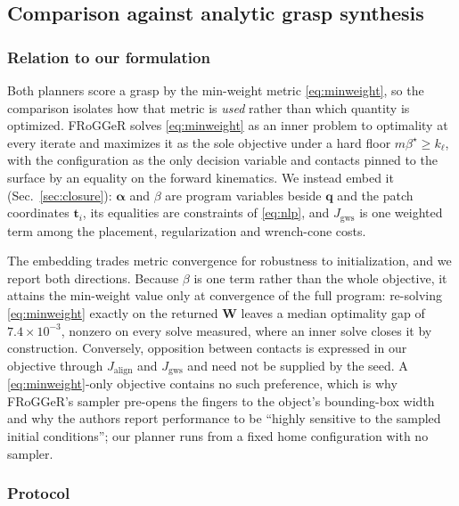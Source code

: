 \subsection{Comparison against analytic grasp synthesis}
\label{sec:frogger}

\subsubsection{Relation to our formulation}
\label{sec:frogger-relation}

Both planners score a grasp by the min-weight metric \eqref{eq:minweight}, so the
comparison isolates how that metric is \emph{used} rather than which quantity is
optimized. FRoGGeR solves \eqref{eq:minweight} as an inner problem to optimality at
every iterate and maximizes it as the sole objective under a hard floor
$m\beta^\star \ge k_\ell$, with the configuration as the only decision variable and
contacts pinned to the surface by an equality on the forward kinematics. We instead
embed it (Sec.~\ref{sec:closure}): $\bm{\alpha}$ and $\beta$ are program variables
beside $\bm{q}$ and the patch coordinates $\bm{t}_i$, its equalities are constraints
of \eqref{eq:nlp}, and $J_{\mathrm{gws}}$ is one weighted term among the placement,
regularization and wrench-cone costs.

The embedding trades metric convergence for robustness to initialization, and we
report both directions. Because $\beta$ is one term rather than the whole objective,
it attains the min-weight value only at convergence of the full program: re-solving
\eqref{eq:minweight} exactly on the returned $\bm{W}$ leaves a median optimality gap
of $7.4\times10^{-3}$, nonzero on every solve measured, where an inner solve closes it
by construction. Conversely, opposition between contacts is expressed in our objective
through $J_{\mathrm{align}}$ and $J_{\mathrm{gws}}$ and need not be supplied by the
seed. A \eqref{eq:minweight}-only objective contains no such preference, which is why
FRoGGeR's sampler pre-opens the fingers to the object's bounding-box width and why the
authors report performance to be ``highly sensitive to the sampled initial
conditions''; our planner runs from a fixed home configuration with no sampler.

\subsubsection{Protocol}

